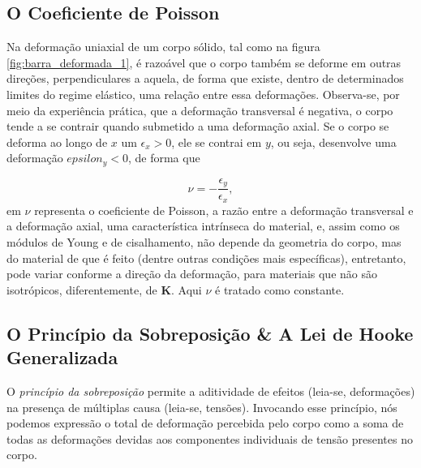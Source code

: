 \subsection{O Coeficiente de Poisson}

Na deformação uniaxial de um corpo sólido, tal como na figura \ref{fig:barra_deformada_1}, é razoável que o corpo também se deforme em outras direções, perpendiculares a aquela, de forma que existe, dentro de determinados limites do regime elástico, uma relação entre essa deformações. Observa-se, por meio da experiência prática, que a deformação transversal é negativa, o corpo tende a se contrair quando submetido a uma deformação axial. Se o corpo se deforma ao longo de $x$ um $\epsilon_x > 0$, ele se contrai em $y$, ou seja, desenvolve uma deformação $epsilon_y < 0$, de forma que \cite{lub}

\begin{equation}
    \nu = -\frac{\epsilon_y}{\epsilon_x},
    \label{eq:coeficiente_de_poisson}
\end{equation}
em $\nu$ representa o coeficiente de Poisson, a razão entre a deformação transversal e a deformação axial, uma característica intrínseca do material, e, assim como os módulos de Young e de cisalhamento, não depende da geometria do corpo, mas do material de que é feito (dentre outras condições mais específicas), entretanto, pode variar conforme a direção da deformação, para materiais que não são isotrópicos, diferentemente, de $\bm{K}$. Aqui $\nu$ é tratado como constante.

\subsection{O Princípio da Sobreposição \& A Lei de Hooke Generalizada}

\begin{citacao}
    O \emph{princípio da sobreposição} permite a aditividade de efeitos (leia-se, deformações) na presença de múltiplas causa (leia-se, tensões). Invocando esse princípio, nós podemos expressão o total de deformação percebida pelo corpo como a soma de todas as deformações devidas aos componentes individuais de tensão presentes no corpo. \cite[pág. 252, tradução livre]{lub}
\end{citacao}

